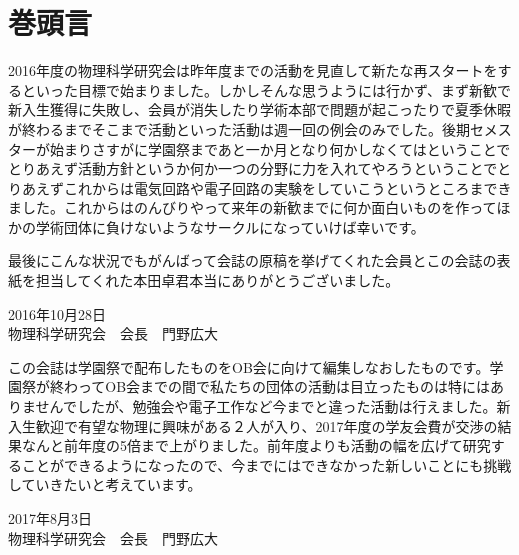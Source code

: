 \documentclass[10pt,b5paper,papersize]{jsbook}
\begin{document}
\frontmatter %

\chapter*{巻頭言}
2016年度の物理科学研究会は昨年度までの活動を見直して新たな再スタートをするといった目標で始まりました。しかしそんな思うようには行かず、まず新歓で新入生獲得に失敗し、会員が消失したり学術本部で問題が起こったりで夏季休暇が終わるまでそこまで活動といった活動は週一回の例会のみでした。後期セメスターが始まりさすがに学園祭まであと一か月となり何かしなくてはということでとりあえず活動方針というか何か一つの分野に力を入れてやろうということでとりあえずこれからは電気回路や電子回路の実験をしていこうというところまできました。これからはのんびりやって来年の新歓までに何か面白いものを作ってほかの学術団体に負けないようなサークルになっていけば幸いです。\par
最後にこんな状況でもがんばって会誌の原稿を挙げてくれた会員とこの会誌の表紙を担当してくれた本田卓君本当にありがとうございました。\par
\begin{flushright}
  \large 2016年10月28日\\
  \large 物理科学研究会　会長　門野広大
\end{flushright}
\vspace{2zw}
\par この会誌は学園祭で配布したものをOB会に向けて編集しなおしたものです。学園祭が終わってOB会までの間で私たちの団体の活動は目立ったものは特にはありませんでしたが、勉強会や電子工作など今までと違った活動は行えました。新入生歓迎で有望な物理に興味がある２人が入り、2017年度の学友会費が交渉の結果なんと前年度の5倍まで上がりました。前年度よりも活動の幅を広げて研究することができるようになったので、今までにはできなかった新しいことにも挑戦していきたいと考えています。
\begin{flushright}
  \large 2017年8月3日\\
  \large 物理科学研究会　会長　門野広大
\end{flushright}


\tableofcontents %

\mainmatter %

\chapter*{}
\vspace{10zw} %
\begin{center}
\end{center}
\end{document}
